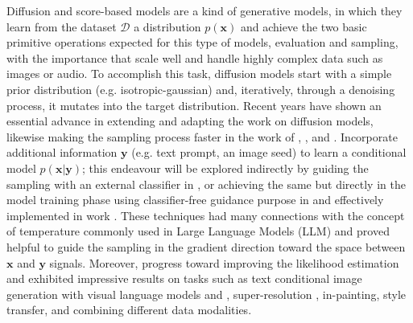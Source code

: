 Diffusion \citep{sohldickstein2015deep} \citep{ho2020denoising} and score-based models \citep{song2020generative} are a kind of generative models, in which they learn from the dataset $\mathcal{D}$ a distribution $p(\mathbf{x})$ and achieve the two basic primitive operations expected for this type of models, evaluation and sampling, with the importance that scale well and handle highly complex data such as images or audio. To accomplish this task, diffusion models start with a simple prior distribution (e.g. isotropic-gaussian) and, iteratively, through a denoising process, it mutates into the target distribution. Recent years have shown an essential advance in extending and adapting the work on diffusion models, likewise making the sampling process faster in the work of \cite{song2020denoising}, \cite{nichol2021improved}, and \cite{Salimans2022ProgressiveDF}. Incorporate additional information $\mathbf{y}$ (e.g. text prompt, an image seed) to learn a conditional model $p(\mathbf{x} | \mathbf{y})$; this endeavour will be explored indirectly by guiding the sampling with an external classifier in \cite{Dhariwal2021DiffusionMB}, or achieving the same but directly in the model training phase using classifier-free guidance purpose in \cite{Ho2022ClassifierFreeDG} and effectively implemented in work \cite{nichol2022glide}. These techniques had many connections with the concept of temperature commonly used in Large Language Models (LLM) and proved helpful to guide the sampling in the gradient direction toward the space between $\mathbf{x}$ and $\mathbf{y}$ signals. Moreover, progress toward improving the likelihood estimation and exhibited impressive results on tasks such as text conditional image generation with visual language models \cite{ramesh2022hierarchical} and \cite{saharia2022photorealistic}, super-resolution \cite{ho2021cascaded}, in-painting, style transfer, and combining different data modalities. \\

